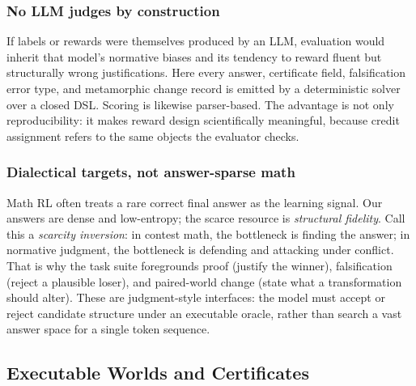 \documentclass[letterpaper]{article}
\begin{document}
\subsubsection{No LLM judges by construction}
If labels or rewards were themselves produced by an LLM, evaluation would inherit that model's normative biases and its tendency to reward fluent but structurally wrong justifications. Here every answer, certificate field, falsification error type, and metamorphic change record is emitted by a deterministic solver over a closed DSL. Scoring is likewise parser-based. The advantage is not only reproducibility: it makes reward design scientifically meaningful, because credit assignment refers to the same objects the evaluator checks.

\subsubsection{Dialectical targets, not answer-sparse math}
Math RL often treats a rare correct final answer as the learning signal. Our answers are dense and low-entropy; the scarce resource is \emph{structural fidelity}. Call this a \emph{scarcity inversion}: in contest math, the bottleneck is finding the answer; in normative judgment, the bottleneck is defending and attacking under conflict. That is why the task suite foregrounds proof (justify the winner), falsification (reject a plausible loser), and paired-world change (state what a transformation should alter). These are judgment-style interfaces: the model must accept or reject candidate structure under an executable oracle, rather than search a vast answer space for a single token sequence.

\subsection{Executable Worlds and Certificates}
\end{document}
